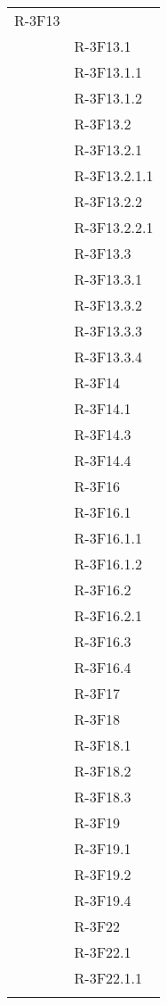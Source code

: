 \begin{longtable}{l p{3cm}}
R-3F13 \tabularnewline &

R-3F13.1 \tabularnewline &

R-3F13.1.1 \tabularnewline &

R-3F13.1.2 \tabularnewline &

R-3F13.2 \tabularnewline &

R-3F13.2.1 \tabularnewline &

R-3F13.2.1.1 \tabularnewline &

R-3F13.2.2 \tabularnewline &

R-3F13.2.2.1 \tabularnewline &

R-3F13.3 \tabularnewline &

R-3F13.3.1 \tabularnewline &

R-3F13.3.2 \tabularnewline &

R-3F13.3.3 \tabularnewline &

R-3F13.3.4 \tabularnewline &

R-3F14 \tabularnewline &

R-3F14.1 \tabularnewline &

R-3F14.3 \tabularnewline &

R-3F14.4 \tabularnewline &

R-3F16 \tabularnewline &

R-3F16.1 \tabularnewline &

R-3F16.1.1 \tabularnewline &

R-3F16.1.2 \tabularnewline &

R-3F16.2 \tabularnewline &

R-3F16.2.1 \tabularnewline &

R-3F16.3 \tabularnewline &

R-3F16.4 \tabularnewline &

R-3F17 \tabularnewline &

R-3F18 \tabularnewline &

R-3F18.1 \tabularnewline &

R-3F18.2 \tabularnewline &

R-3F18.3 \tabularnewline &

R-3F19 \tabularnewline &

R-3F19.1 \tabularnewline &

R-3F19.2 \tabularnewline &

R-3F19.4 \tabularnewline &

R-3F22 \tabularnewline &

R-3F22.1 \tabularnewline &

R-3F22.1.1 \tabularnewline &


\end{longtable}
